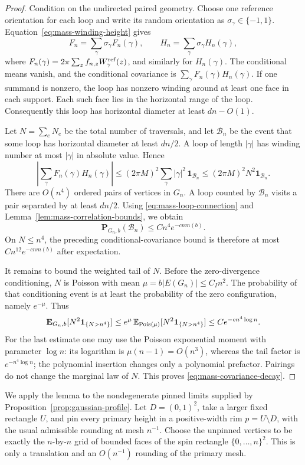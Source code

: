 \begin{proof}
Condition on the undirected paired geometry.  Choose one reference
orientation for each loop and write its random orientation as
\(\sigma_\gamma\in\{-1,1\}\).  Equation~\eqref{eq:mass-winding-height}
gives
\[
 F_n=\sum_\gamma\sigma_\gamma F_n(\gamma),\qquad
 H_n=\sum_\gamma\sigma_\gamma H_n(\gamma),
\]
where
\(F_n(\gamma)=2\pi\sum_zf_{n,z}W_\gamma^{\rm ref}(z)\),
and similarly for \(H_n(\gamma)\).
The conditional means vanish, and the conditional covariance is
\(\sum_\gamma F_n(\gamma)H_n(\gamma)\).
If one summand is nonzero, the loop has nonzero winding around
at least one face in each support.  Each such face lies in the
horizontal range of the loop.  Consequently this loop has
horizontal diameter at least \(dn-O(1)\).

Let \(N=\sum_eN_e\) be the total number of traversals, and let
\(\mathcal B_n\) be the event that some loop has horizontal diameter
at least \(dn/2\).  A loop of length \(|\gamma|\) has winding
number at most \(|\gamma|\) in absolute value.  Hence
\[
 \left|\sum_\gamma F_n(\gamma)H_n(\gamma)\right|
 \le (2\pi M)^2\sum_\gamma|\gamma|^2\,\mathbf1_{\mathcal B_n}
 \le (2\pi M)^2N^2\mathbf1_{\mathcal B_n}.
\]
There are \(O(n^4)\) ordered pairs of vertices in \(G_n\).
A loop counted by \(\mathcal B_n\) visits a pair separated by at
least \(dn/2\).  Using \eqref{eq:mass-loop-connection} and
Lemma~\ref{lem:mass-correlation-bounds}, we obtain
\[
 \mathbf P_{G_n,b}(\mathcal B_n)
 \le C n^4 e^{-c n m(b)}.
\]
On \(N\le n^4\), the preceding conditional-covariance bound is
therefore at most \(C n^{12}e^{-c n m(b)}\) after expectation.

It remains to bound the weighted tail of \(N\).  Before the
zero-divergence conditioning, \(N\) is Poisson with mean
\(\mu=b|E(G_n)|\le C_I n^2\).  The probability of that conditioning
event is at least the probability of the zero configuration,
namely \(e^{-\mu}\).  Thus
\[
 \mathbf E_{G_n,b}[N^2\mathbf1_{\{N>n^4\}}]
 \le e^{\mu}\,
     \mathbb E_{\operatorname{Pois}(\mu)}[N^2\mathbf1_{\{N>n^4\}}]
 \le Ce^{-c n^4\log n}.
\]
For the last estimate one may use the Poisson exponential moment
with parameter \(\log n\): its logarithm is
\(\mu(n-1)=O(n^3)\), whereas the tail factor is
\(e^{-n^4\log n}\); the polynomial insertion changes only a
polynomial prefactor.  Pairings do not change the marginal law of
\(N\).  This proves \eqref{eq:mass-covariance-decay}.
\end{proof}

We apply the lemma to the nondegenerate pinned limits supplied by
Proposition~\ref{prop:gaussian-profile}.  Let \(D=(0,1)^2\), take a
larger fixed rectangle \(U\), and pin every primary height in a
positive-width rim \(p=U\setminus D\), with the usual admissible
rounding at mesh \(n^{-1}\).  Choose the unpinned vertices to be
exactly the \(n\)-by-\(n\) grid of bounded faces of the spin rectangle
\(\{0,\ldots,n\}^2\).  This is only a translation and an
\(O(n^{-1})\) rounding of the primary mesh.


